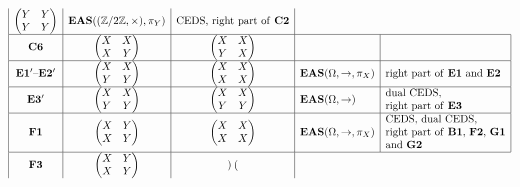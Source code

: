 \documentclass[10pt,a4paper]{amsart}
\numberwithin{equation}{section}
\newcommand{\eas}{\mathbf{EAS}}
\begin{document}
$$\begin{array}{|c|c|c|l|l|}
\begin{pmatrix}
Y&Y\\Y&Y
\end{pmatrix}&\eas((\mathbb{Z}/2\mathbb{Z},\times),\pi_Y)&\text{CEDS, right part of \textbf{C2}}\\
\hline \mathbf{C6}&\begin{pmatrix}
X&X\\X&Y
\end{pmatrix}&
\begin{pmatrix}
X&X\\Y&X
\end{pmatrix}&&\\
\hline \mathbf{E1'}\text{--}\mathbf{E2'}&\begin{pmatrix}
X&X\\Y&Y
\end{pmatrix}&
\begin{pmatrix}
X&X\\X&X
\end{pmatrix}&\eas(\Omega,\rightarrow,\pi_X)&\text{right part of \textbf{E1} and \textbf{E2}}\\
\hline \mathbf{E3'}&\begin{pmatrix}
X&X\\Y&Y
\end{pmatrix}&
\begin{pmatrix}
X&X\\Y&Y
\end{pmatrix}&\eas(\Omega,\rightarrow)&\begin{array}{@{}l@{}}\text{dual CEDS},\\
\text{right part of \textbf{E3}}\end{array}\\
\hline\mathbf{ F1}&\begin{pmatrix}
X&Y\\X&Y
\end{pmatrix}&
\begin{pmatrix}
X&X\\X&X
\end{pmatrix}&\eas(\Omega,\rightarrow,\pi_X)&\begin{array}{@{}l@{}}\text{CEDS, dual CEDS},\\
\text{right part of \textbf{B1}, \textbf{F2}, \textbf{G1}}\\
\text{and \textbf{G2}}\end{array}\\
\hline \mathbf{F3}&\begin{pmatrix}
X&Y\\X&Y
\end{pmatrix}&
\begin{pmatrix}

\end{pmatrix}
\end{array}$$
\end{document}
